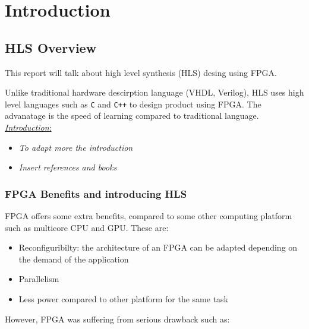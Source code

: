 


\chapter{Introduction}


\section{HLS Overview}
\label{sec:hls_view}

This report will talk about high level synthesis (HLS) desing using FPGA. 

Unlike traditional hardware descirption language (VHDL, Verilog), HLS uses high level languages such as \verb|C| and \verb|C++| to design product using FPGA. The advanatage is the speed of learning compared to traditional language.\\


 \underline{\textit{Introduction}:}

\begin{itemize}

\item \textit{To adapt more the introduction}

\item \textit{Insert references and books}

\end{itemize} 

\subsection{FPGA Benefits and introducing HLS}

FPGA offers some extra benefits, compared to some other computing platform such as multicore CPU and GPU. These are:

\begin{itemize}

\item Reconfiguribilty: the architecture of an FPGA can be adapted depending on the demand of the application

\item Parallelism

\item Less power compared to other platform for the same task

\end{itemize}

However, FPGA was suffering from serious drawback such as:

